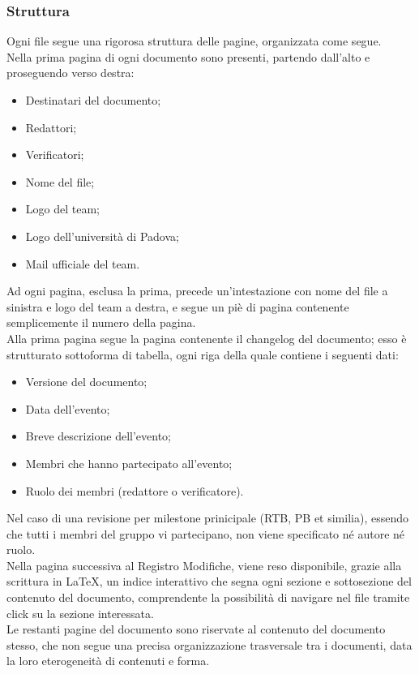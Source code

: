 \subsubsection{Struttura}
Ogni file segue una rigorosa struttura delle pagine, organizzata come segue.
\\
Nella prima pagina di ogni documento sono presenti, partendo dall'alto e proseguendo verso destra:
\begin{itemize}
    \item Destinatari del documento;
    \item Redattori;
    \item Verificatori;
    \item Nome del file; 
    \item Logo del team;
    \item Logo dell'università di Padova;
    \item Mail ufficiale del team.
\end{itemize}
Ad ogni pagina, esclusa la prima, precede un'intestazione con nome del file a sinistra e logo del team a destra, e segue un piè di pagina contenente semplicemente il numero della pagina. 
\\
Alla prima pagina segue la pagina contenente il changelog del documento; esso è strutturato sottoforma di tabella, ogni riga della quale contiene i seguenti dati:
\begin{itemize}
    \item Versione del documento;
    \item Data dell'evento;
    \item Breve descrizione dell'evento;
    \item Membri che hanno partecipato all'evento;
    \item Ruolo dei membri (redattore o verificatore).
\end{itemize}
Nel caso di una revisione per milestone prinicipale (RTB, PB et similia), essendo che tutti i membri del gruppo vi partecipano, non viene specificato né autore né ruolo. 
\\
Nella pagina successiva al Registro Modifiche, viene reso disponibile, grazie alla scrittura in \LaTeX, un indice interattivo che segna ogni sezione e sottosezione del contenuto del documento, comprendente la possibilità di navigare nel file tramite click su la sezione interessata.
\\
Le restanti pagine del documento sono riservate al contenuto del documento stesso, che non segue una precisa organizzazione trasversale tra i documenti, data la loro eterogeneità di contenuti e forma.

